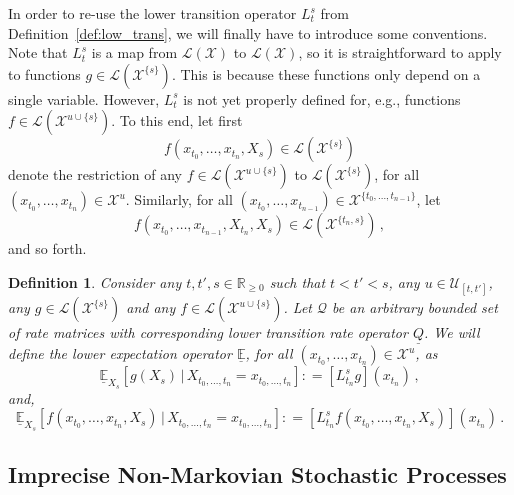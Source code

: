 \documentclass[10pt]{paper}
\newtheorem{definition}{Definition}
\newcommand{\reals}{\mathbb{R}}
\newcommand{\realsnonneg}{\reals_{\geq 0}}
\newcommand{\states}{\mathcal{X}}
\newcommand{\gambles}{\mathcal{L}}
\newcommand{\gamblesX}{\gambles(\states)}
\newcommand{\rateset}{\mathcal{Q}}
\newcommand{\lrate}{\underline{Q}}
\newcommand{\coloneqq}{:\!=}
\begin{document}
In order to re-use the lower transition operator $L_t^s$ from Definition~\ref{def:low_trans}, we will finally have to introduce some conventions. Note that $L_t^s$ is a map from $\gamblesX$ to $\gamblesX$, so it is straightforward to apply to functions $g\in\gambles(\states^{\{s\}})$. This is because these functions only depend on a single variable. However, $L_t^s$ is not yet properly defined for, e.g., functions $f\in\gambles(\states^{u\cup\{s\}})$. To this end, let first 
\begin{equation*}
f(x_{t_0},\ldots,x_{t_n},X_{s})\in\gambles(\states^{\{s\}})
\end{equation*}
denote the restriction of any $f\in\gambles(\states^{u\cup\{s\}})$ to $\gambles(\states^{\{s\}})$, for all $(x_{t_0},\ldots,x_{t_n})\in\states^u$. Similarly, for all $(x_{t_0},\ldots,x_{t_{n-1}})\in\states^{\{t_0,\ldots,t_{n-1}\}}$, let
\begin{equation*} f(x_{t_0},\ldots,x_{t_{n-1}},X_{t_n},X_s)\in\gambles(\states^{\{t_n,s\}})\,,
\end{equation*}
and so forth.

\begin{definition}
Consider any $t,t',s\in\realsnonneg$ such that $t<t'<s$, any $u\in\mathcal{U}_{[t,t']}$, any $g\in\gambles(\states^{\{s\}})$ and any $f\in\gambles(\states^{u\cup\{s\}})$. Let $\rateset$ be an arbitrary bounded set of rate matrices with corresponding lower transition rate operator $\lrate$. We will define the \emph{lower expectation operator} $\underline{\mathbb{E}}$, for all $(x_{t_0},\ldots,x_{t_n})\in\states^u$, as
\begin{equation*}
\underline{\mathbb{E}}_{X_s}[g(X_s)\,\vert\,X_{t_0,\ldots,t_n}=x_{t_0,\ldots,t_n}] \coloneqq \left[L_{t_n}^sg\right](x_{t_n})\,,
\end{equation*}
and,
\begin{equation*}
\underline{\mathbb{E}}_{X_s}[f(x_{t_0},\ldots,x_{t_n},X_s)\,\vert\,X_{t_0,\ldots,t_n}=x_{t_0,\ldots,t_n}] \coloneqq \left[L_{t_n}^sf(x_{t_0},\ldots,x_{t_n},X_s)\right](x_{t_n})\,.
\end{equation*}
\end{definition}

\subsection{Imprecise Non-Markovian Stochastic Processes}
\end{document}
